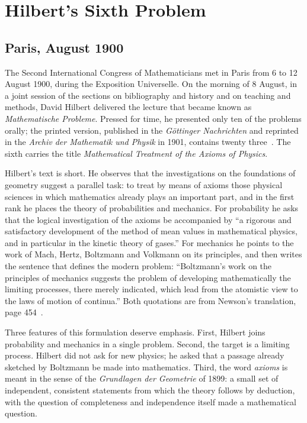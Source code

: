 \chapter{Hilbert's Sixth Problem}
\label{ch:hilbert}

\section{Paris, August 1900}

The Second International Congress of Mathematicians met in Paris from 6 to 12 August 1900, during the Exposition Universelle. On the morning of 8 August, in a joint session of the sections on bibliography and history and on teaching and methods, David Hilbert delivered the lecture that became known as \emph{Mathematische Probleme}. Pressed for time, he presented only ten of the problems orally; the printed version, published in the \emph{G\"ottinger Nachrichten} and reprinted in the \emph{Archiv der Mathematik und Physik} in 1901, contains twenty three~\cite{hilbert1900}. The sixth carries the title \emph{Mathematical Treatment of the Axioms of Physics}.

Hilbert's text is short. He observes that the investigations on the foundations of geometry suggest a parallel task: to treat by means of axioms those physical sciences in which mathematics already plays an important part, and in the first rank he places the theory of probabilities and mechanics. For probability he asks that the logical investigation of the axioms be accompanied by ``a rigorous and satisfactory development of the method of mean values in mathematical physics, and in particular in the kinetic theory of gases.'' For mechanics he points to the work of Mach, Hertz, Boltzmann and Volkmann on its principles, and then writes the sentence that defines the modern problem: ``Boltzmann's work on the principles of mechanics suggests the problem of developing mathematically the limiting processes, there merely indicated, which lead from the atomistic view to the laws of motion of continua.'' Both quotations are from Newson's translation, page 454~\cite{hilbert1900}.

Three features of this formulation deserve emphasis. First, Hilbert joins probability and mechanics in a single problem. Second, the target is a limiting process. Hilbert did not ask for new physics; he asked that a passage already sketched by Boltzmann be made into mathematics. Third, the word \emph{axioms} is meant in the sense of the \emph{Grundlagen der Geometrie} of 1899: a small set of independent, consistent statements from which the theory follows by deduction, with the question of completeness and independence itself made a mathematical question.

